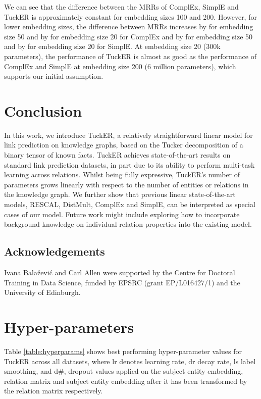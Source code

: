 \documentclass[11pt,a4paper]{article}
\begin{document}
 We can see that the difference between the MRRs of ComplEx, SimplE and TuckER is approximately constant for embedding sizes 100 and 200. However, for lower embedding sizes, the difference between MRRs increases by  for embedding size 50 and by  for embedding size 20 for ComplEx and by  for embedding size 50 and by  for embedding size 20 for SimplE. At embedding size 20 (300k parameters), the performance of TuckER is almost as good as the performance of ComplEx and SimplE at embedding size 200 (6 million parameters), which supports our initial assumption.

\section{Conclusion}
\vspace{-0.1cm}

In this work, we introduce TuckER, a relatively straightforward linear model for link prediction on knowledge graphs, based on the Tucker decomposition of a binary tensor of known facts. TuckER achieves state-of-the-art results on standard link prediction datasets, in part due to its ability to perform multi-task learning across relations. Whilst being fully expressive, TuckER's number of parameters grows linearly with respect to the number of entities or relations in the knowledge graph. We further show that previous linear state-of-the-art models, RESCAL, DistMult, ComplEx and SimplE, can be interpreted as special cases of our model. Future work might include exploring how to incorporate background knowledge on individual relation properties into the existing model.

\subsection*{Acknowledgements}
Ivana Bala\v{z}evi\'c and Carl Allen were supported by the Centre for Doctoral Training in Data Science, funded by EPSRC (grant EP/L016427/1) and the University of Edinburgh.





\clearpage
\appendix

\section{Hyper-parameters}
\label{sec:hyperparams}

Table \ref{table:hyperparams} shows best performing hyper-parameter values for TuckER across all datasets, where lr denotes learning rate, dr decay rate, ls label smoothing, and d\#,  dropout values applied on the subject entity embedding, relation matrix and subject entity embedding after it has been transformed by the relation matrix respectively.
\end{document}
